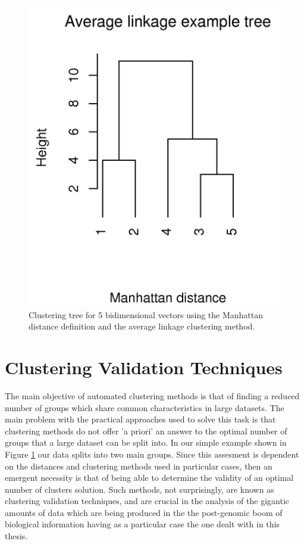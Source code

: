 \begin{figure}[t]
\centering
\includegraphics[scale=0.3]{Appendix/appendixtree.png}
\caption{Clustering  tree  for   5  bidimensional  vectors  using  the
  Manhattan  distance definition  and the  average  linkage clustering
  method.}
\label{fig:tree}
\end{figure}

\section{Clustering Validation Techniques}
The main objective of automated  clustering methods is that of finding
a reduced number of groups which share common characteristics in large
datasets. The main problem with the practical approaches used to solve
this task is that clustering methods do not offer 'a priori' an answer
to the  optimal number  of groups  that a large  dataset can  be split
into. In  our simple example  shown in Figure \ref{fig:tree}  our data
splits into two main groups.  Since this assesment is dependent on the
distances  and clustering methods  used in  particular cases,  then an
emergent necessity is that of  being able to determine the validity of
an   optimal  number   of   clusters  solution.   Such  methods,   not
surprisingly, are  known as clustering validation  techniques, and are
crucial  in the analysis  of the  gigantic amounts  of data  which are
being produced in the  the post-genomic boom of biological information
\cite{handl2005} having  as a  particular case the  one dealt  with in
this thesis.

